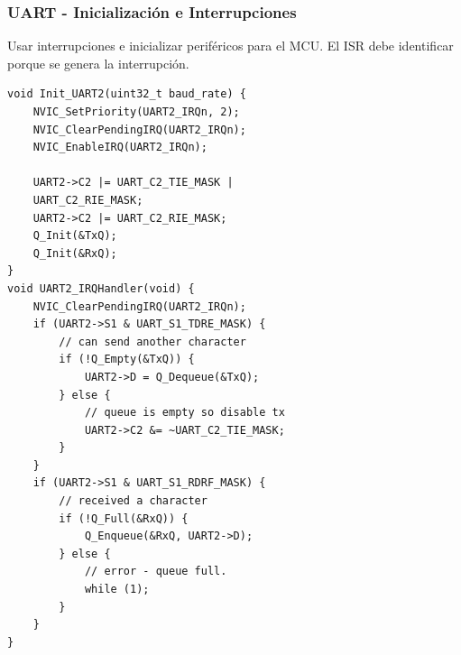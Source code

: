 \documentclass[10.5pt,scale=1.0,t,aspectratio=169,hyperref={pdfpagelabels=false}]{beamer}
\begin{document}
\begin{frame}[fragile]
	\frametitle{UART - Inicialización e Interrupciones}
	{\small
		Usar interrupciones e inicializar periféricos para el MCU. El ISR debe identificar porque se genera la interrupción. 
		
		\begin{multicols}{2}
		\begin{lstlisting}[style=CStyle]
void Init_UART2(uint32_t baud_rate) {
	NVIC_SetPriority(UART2_IRQn, 2); 
	NVIC_ClearPendingIRQ(UART2_IRQn); 
	NVIC_EnableIRQ(UART2_IRQn);
	
	UART2->C2 |= UART_C2_TIE_MASK | 
	UART_C2_RIE_MASK;
	UART2->C2 |= UART_C2_RIE_MASK;
	Q_Init(&TxQ);
	Q_Init(&RxQ);
}
void UART2_IRQHandler(void) {
	NVIC_ClearPendingIRQ(UART2_IRQn);
	if (UART2->S1 & UART_S1_TDRE_MASK) {
		// can send another character
		if (!Q_Empty(&TxQ)) {
			UART2->D = Q_Dequeue(&TxQ);
		} else {
			// queue is empty so disable tx
			UART2->C2 &= ~UART_C2_TIE_MASK;
		}
	}
	if (UART2->S1 & UART_S1_RDRF_MASK) {
		// received a character
		if (!Q_Full(&RxQ)) {
			Q_Enqueue(&RxQ, UART2->D);
		} else {
			// error - queue full.
			while (1);
		}
	}	
}
		\end{lstlisting}	
		\end{multicols}
				
	}
\end{frame}
\frame{
\begin{center}
	\LARGE \textcolor{blue}{COMUNICACIONES SERIALES}
\end{center}

\begin{center}
	\LARGE \textcolor{blue}{GRACIAS}
\end{center}
}

\end{document}
